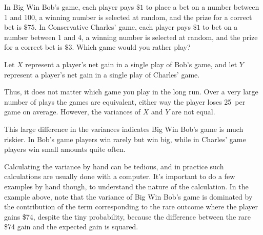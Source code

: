 \begin{example} In Big Win Bob's game, each player pays $\$1$ to place a bet on a number between 1 and 100, a winning number is selected at random, and the prize for a correct bet is $\$75$. In Conservative Charles' game, each player pays $\$1$ to bet on a number between 1 and 4, a winning number is selected at random, and the prize for a correct bet is $\$3$. Which game would you rather play?

Let $X$ represent a player's net gain in a single play of Bob's game, and let $Y$ represent a player's net gain in a single play of Charles' game.

Thus, it does not matter which game you play in the long run. Over a very large number of plays the games are equivalent, either way the player loses 25\textcent\ per game on average. However, the variances of $X$ and $Y$ are not equal.

This large difference in the variances indicates Big Win Bob's game is much riskier. In Bob's game players win rarely but win big, while in Charles' game players win small amounts quite often.
\end{example}

Calculating the variance by hand can be tedious, and in practice such calculations are usually done with a computer. It's important to do a few examples by hand though, to understand the nature of the calculation. In the example above, note that the variance of Big Win Bob's game is dominated by the contribution of the term corresponding to the rare outcome where the player gains \$74, despite the tiny probability, because the difference between the rare \$74 gain and the expected gain is squared.

